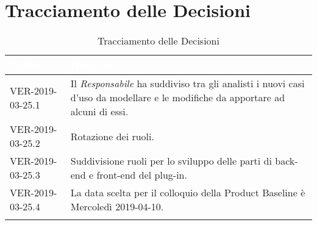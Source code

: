 \newpage
\section{Tracciamento delle Decisioni}

\begin{longtable}{|C{.40\textwidth}|C{.60\textwidth}|}
\hline
{}\textbf{\textcolor{white}{Codice}} & \textbf{\textcolor{white}{Decisione}}\\
\hline
VER-2019-03-25.1 & Il \textit{Responsabile} ha suddiviso tra gli analisti i nuovi casi d'uso da modellare e le modifiche da apportare ad alcuni di essi.  \\
\hline
{}VER-2019-03-25.2 & Rotazione dei ruoli. \\
\hline
VER-2019-03-25.3 & Suddivisione ruoli per lo sviluppo delle parti di back-end e front-end del plug-in.\\
\hline
{}VER-2019-03-25.4 & La data scelta per il colloquio della Product Baseline è Mercoledì 2019-04-10.\\
\hline

\caption{Tracciamento delle Decisioni}
\end{longtable}
